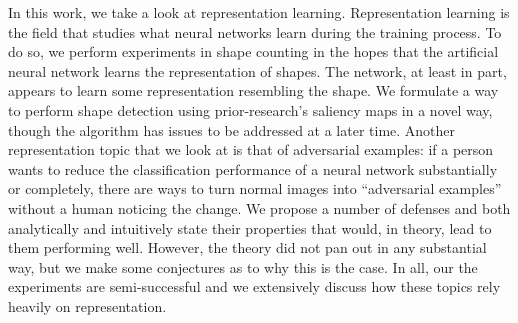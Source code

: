 In this work, we take a look at representation learning.
Representation learning is the field that studies what neural networks learn during the training
process.
To do so, we perform experiments in shape counting in the hopes that the artificial neural network
learns the representation of shapes. The network, at least in part, appears to learn some
representation resembling the shape. We formulate a way to perform shape detection using
prior-research's saliency maps in a novel way, though the algorithm has issues to be addressed at a
later time. Another representation topic that we look at is that of adversarial examples: if a
person wants to reduce the classification performance of a neural network substantially or
completely, there are ways to turn normal images into ``adversarial examples'' without a human
noticing the change. We propose a number of defenses and both analytically and intuitively state
their properties that would, in theory, lead to them performing well. However, the theory did not
pan out in any substantial way, but we make some conjectures as to why this is the case. In all, our
the experiments are semi-successful and we extensively discuss how these topics rely heavily on
representation.